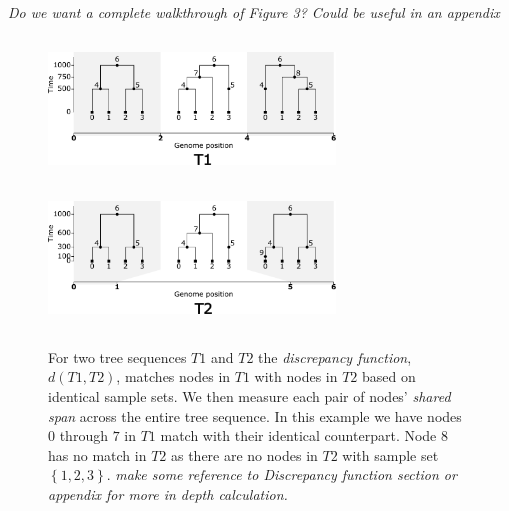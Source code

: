\documentclass[10pt,twoside,lineno]{gsajnl}
\newcommand{\comment}[1]{{\color{violet} \it #1}}
\begin{document}
\comment{Do we want a complete walkthrough of Figure 3? Could be useful in an appendix} 

\begin{figure}[!ht]
	\begin{center}
\includegraphics[height=1.5in, width=3in]{discrepancy_func_method_t1.pdf}
\includegraphics[height=1.5in, width=3in]{discrepancy_function_method_t2.pdf}
    \caption{
        For two tree sequences $T1$ and $T2$ the \textit{discrepancy function}, $d(T1,T2)$, matches nodes in $T1$ with nodes in $T2$
        based on identical sample sets. We then measure each pair of nodes' \textit{shared span} across the entire tree sequence.
        In this example we have nodes $0$ through $7$ in $T1$ match with their identical counterpart. 
        Node $8$ has no match in $T2$ as there are no nodes in $T2$ with sample set $\left\{1,2,3\right\}$.
        \comment{make some reference to Discrepancy function section or appendix for more in depth calculation.}
        \label{fig:conceptual_discrepancy}
    }
	\end{center}
\end{figure}
 
\end{document}
